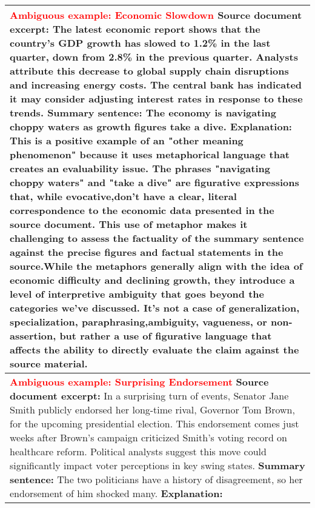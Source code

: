 \begin{table*}
\centering
\small
\begin{tabular}{@{}p{14cm}@{}}
\toprule
\textbf{\textcolor{red}{Ambiguous example: Economic Slowdown}}
\newline
\textbf{Source document excerpt:}
The latest economic report shows that the country's GDP growth has slowed to 1.2\% in the last quarter, down from 2.8\% in the previous quarter. Analysts attribute this decrease to global supply chain disruptions and increasing energy costs. The central bank has indicated it may consider adjusting interest rates in response to these trends.
\newline
\textbf{Summary sentence:}
The economy is navigating choppy waters as growth figures take a dive.
\newline
\textbf{Explanation:}
This is a positive example of an "other meaning phenomenon" because it uses metaphorical language that creates an evaluability issue. The phrases "navigating choppy waters" and "take a dive" are figurative expressions that, while evocative,don't have a clear, literal correspondence to the economic data presented in the source document. This use of metaphor makes it challenging to assess the factuality of the summary sentence against the precise figures and factual statements in the source.While the metaphors generally align with the idea of economic difficulty and declining growth, they introduce a level of interpretive ambiguity that goes beyond the categories we've discussed. It's not a case of generalization, specialization, paraphrasing,ambiguity, vagueness, or non-assertion, but rather a use of figurative language that affects the ability to directly evaluate the claim against the source material.
\\
\midrule
\textbf{\textcolor{red}{Ambiguous example: Surprising Endorsement}}
\newline
\textbf{Source document excerpt:}
In a surprising turn of events, Senator Jane Smith publicly endorsed her long-time rival, Governor Tom Brown, for the upcoming presidential election. This endorsement comes just weeks after Brown’s campaign criticized Smith’s voting record on healthcare reform. Political analysts suggest this move could significantly impact voter perceptions in key swing states.
\newline
\textbf{Summary sentence:}
The two politicians have a history of disagreement, so her endorsement of him shocked many.
\newline
\textbf{Explanation:}

\end{tabular}
\end{table*}
